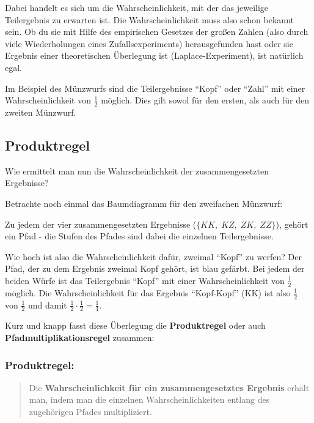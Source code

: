 \documentclass[
  ngerman,
]{book}
\begin{document}
Dabei handelt es sich um die Wahrscheinlichkeit, mit der das jeweilige Teilergebnis zu erwarten ist. Die Wahrscheinlichkeit muss also schon bekannt sein. Ob du sie mit Hilfe des empirischen Gesetzes der großen Zahlen (also durch viele Wiederholungen eines Zufallsexperiments) herausgefunden hast oder sie Ergebnis einer theoretischen Überlegung ist (Laplace-Experiment), ist natürlich egal.

Im Beispiel des Münzwurfs sind die Teilergebnisse ``Kopf'' oder ``Zahl'' mit einer Wahrscheinlichkeit von \(\frac{1}{2}\) möglich. Dies gilt sowol für den ersten, als auch für den zweiten Münzwurf.

\hypertarget{produktregel}{%
\subsection{Produktregel}\label{produktregel}}

Wie ermittelt man nun die Wahrscheinlichkeit der zusammengesetzten Ergebnisse?

Betrachte noch einmal das Baumdiagramm für den zweifachen Münzwurf:

Zu jedem der vier zusammengesetzten Ergebnisse (\(\{KK,\; KZ,\; ZK,\; ZZ\}\)), gehört ein Pfad - die Stufen des Pfades sind dabei die einzelnen Teilergebnisse.

Wie hoch ist also die Wahrscheinlichkeit dafür, zweimal ``Kopf'' zu werfen? Der Pfad, der zu dem Ergebnis zweimal Kopf gehört, ist blau gefärbt. Bei jedem der beiden Würfe ist das Teilergebnis ``Kopf'' mit einer Wahrscheinlichkeit von \(\frac{1}{2}\) möglich. Die Wahrscheinlichkeit für das Ergebnis ``Kopf-Kopf'' (KK) ist also \(\frac{1}{2}\) von \(\frac{1}{2}\) und damit \(\frac{1}{2}\cdot\frac{1}{2}=\frac{1}{4}\).

Kurz und knapp fasst diese Überlegung die \textbf{Produktregel} oder auch \textbf{Pfadmultiplikationsregel} zusammen:

\hypertarget{produktregel-1}{%
\subsubsection*{Produktregel:}\label{produktregel-1}}

\begin{quote}
Die \textbf{Wahrscheinlichkeit für ein zusammengesetztes Ergebnis} erhält man, indem man die einzelnen Wahrscheinlichkeiten entlang des zugehörigen Pfades multipliziert.
\end{quote}
\end{document}
